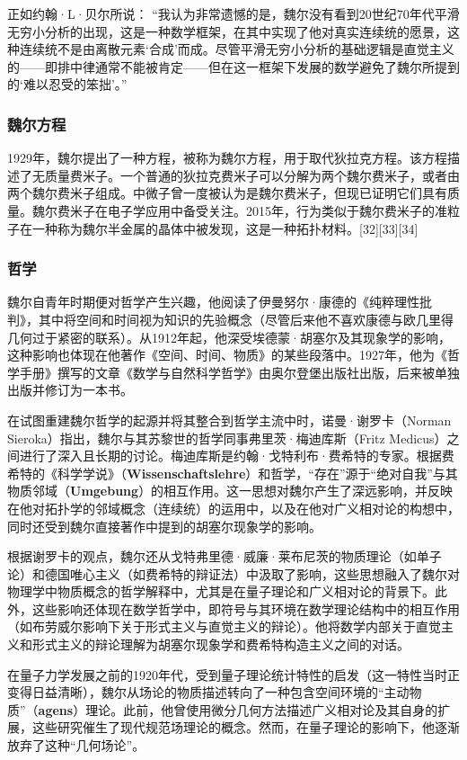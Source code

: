 正如约翰·L·贝尔所说：  
“我认为非常遗憾的是，魏尔没有看到20世纪70年代平滑无穷小分析的出现，这是一种数学框架，在其中实现了他对真实连续统的愿景，这种连续统不是由离散元素‘合成’而成。尽管平滑无穷小分析的基础逻辑是直觉主义的——即排中律通常不能被肯定——但在这一框架下发展的数学避免了魏尔所提到的‘难以忍受的笨拙’。”  
\subsubsection{魏尔方程} 
1929年，魏尔提出了一种方程，被称为魏尔方程，用于取代狄拉克方程。该方程描述了无质量费米子。一个普通的狄拉克费米子可以分解为两个魏尔费米子，或者由两个魏尔费米子组成。中微子曾一度被认为是魏尔费米子，但现已证明它们具有质量。魏尔费米子在电子学应用中备受关注。2015年，行为类似于魏尔费米子的准粒子在一种称为魏尔半金属的晶体中被发现，这是一种拓扑材料。[32][33][34]
\subsubsection{哲学}
魏尔自青年时期便对哲学产生兴趣，他阅读了伊曼努尔·康德的《纯粹理性批判》，其中将空间和时间视为知识的先验概念（尽管后来他不喜欢康德与欧几里得几何过于紧密的联系）。从1912年起，他深受埃德蒙·胡塞尔及其现象学的影响，这种影响也体现在他著作《空间、时间、物质》的某些段落中。1927年，他为《哲学手册》撰写的文章《数学与自然科学哲学》由奥尔登堡出版社出版，后来被单独出版并修订为一本书。  

在试图重建魏尔哲学的起源并将其整合到哲学主流中时，诺曼·谢罗卡（Norman Sieroka）指出，魏尔与其苏黎世的哲学同事弗里茨·梅迪库斯（Fritz Medicus）之间进行了深入且长期的讨论。梅迪库斯是约翰·戈特利布·费希特的专家。根据费希特的《科学学说》（\textbf{Wissenschaftslehre}）和哲学，“存在”源于“绝对自我”与其物质邻域（\textbf{Umgebung}）的相互作用。这一思想对魏尔产生了深远影响，并反映在他对拓扑学的邻域概念（连续统）的运用中，以及在他对广义相对论的构想中，同时还受到魏尔直接著作中提到的胡塞尔现象学的影响。  

根据谢罗卡的观点，魏尔还从戈特弗里德·威廉·莱布尼茨的物质理论（如单子论）和德国唯心主义（如费希特的辩证法）中汲取了影响，这些思想融入了魏尔对物理学中物质概念的哲学解释中，尤其是在量子理论和广义相对论的背景下。此外，这些影响还体现在数学哲学中，即符号与其环境在数学理论结构中的相互作用（如布劳威尔影响下关于形式主义与直觉主义的辩论）。他将数学内部关于直觉主义和形式主义的辩论理解为胡塞尔现象学和费希特构造主义之间的对话。  

在量子力学发展之前的1920年代，受到量子理论统计特性的启发（这一特性当时正变得日益清晰），魏尔从场论的物质描述转向了一种包含空间环境的“主动物质”（\textbf{agens}）理论。此前，他曾使用微分几何方法描述广义相对论及其自身的扩展，这些研究催生了现代规范场理论的概念。然而，在量子理论的影响下，他逐渐放弃了这种“几何场论”。  

